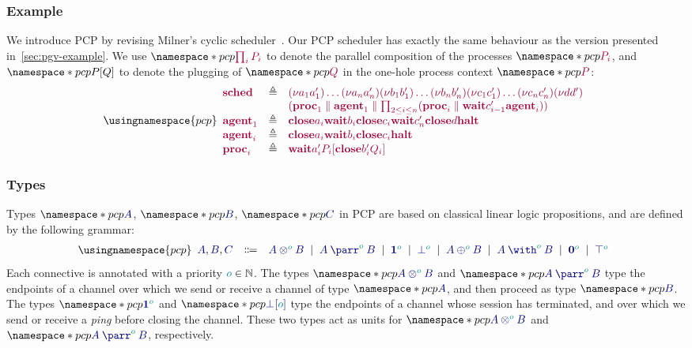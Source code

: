 \documentclass[main.tex]{subfiles}
\begin{document}
\subsubsection*{Example}\label{sec:pcp-example}
We introduce PCP by revising Milner's cyclic scheduler~\cite{milner89,dardhagay18}. Our PCP scheduler has exactly the same behaviour as the version presented in~\cref{sec:pgv-example}. We use $\pcp{\tm{\prod_{i}P_i}}$ to denote the parallel composition of the processes $\pcp{\tm{P_i}}$, and $\pcp{\plug{P}{Q}}$ to denote the plugging of $\pcp{\tm{Q}}$ in the one-hole process context $\pcp{\tm{P}}$:
\[
  \usingnamespace{pcp}
  \begin{array}{lrlr}
    \tm{\sched}
    & \defeq & \tm{\res{a_1}{a'_1}{\dots{\res{a_n}{a'_n}{}}}}
               \tm{\res{b_1}{b'_1}{\dots{\res{b_n}{b'_n}{}}}}
               \tm{\res{c_1}{c'_1}{\dots{\res{c_n}{c'_n}{}}}}
               \tm{\res{d}{d'}{}}
    \\ &     & \tm{(
               \ppar{\proc1}{\agent1}
               \parallel
               \prod_{2\leq{i}\leq{n}}(\ppar{\proc{i}}{\wait{c'_{i-1}}{\agent{i}}})
               )}
    \\
    \tm{\agent1}
    & \defeq & \tm{\close{a_i}{\wait{b_i}{\close{c_i}{\wait{c'_n}{\close{d}{\halt}}}}}}
    \\
    \tm{\agent{i}}
    & \defeq & \tm{\close{a_i}{\wait{b_i}{\close{c_i}{\halt}}}}
    \\
    \tm{\proc{i}}
    & \defeq & \tm{\wait{a'_i}{\plug{P_i}{\close{b'_i}{Q_i}}}}
  \end{array}
\]

\subsubsection*{Types}
Types $\pcp{\ty{A}}$, $\pcp{\ty{B}}$, $\pcp{\ty{C}}$ in PCP are based on classical linear logic propositions, and are defined by the following grammar:
\[
  \usingnamespace{pcp}
  \begin{array}{lcl}
    \ty{A}, \ty{B}, \ty{C}
    & \Coloneqq & \ty{\tytens[\cs{o}]{A}{B}}
      \sep        \ty{\typarr[\cs{o}]{A}{B}}
      \sep        \ty{\tyone[\cs{o}]}
      \sep        \ty{\tybot[\cs{o}]}
      \sep        \ty{\typlus[\cs{o}]{A}{B}}
      \sep        \ty{\tywith[\cs{o}]{A}{B}}
      \sep        \ty{\tynil[\cs{o}]}
      \sep        \ty{\tytop[\cs{o}]}
  \end{array}
\]
Each connective is annotated with a priority $\cs{o}\in\mathbb{N}$.
The types $\pcp{\ty{\tytens[\cs{o}]{A}{B}}}$ and $\pcp{\ty{\typarr[\cs{o}]{A}{B}}}$ type the endpoints of a channel over which we send or receive a channel of type $\pcp{\ty{A}}$, and then proceed as type $\pcp{\ty{B}}$. The types $\pcp{\ty{\tyone[\cs{o}]}}$ and $\pcp{\ty{{\tybot}[\cs{o}]}}$ type the endpoints of a channel whose session has terminated, and over which we send or receive a \emph{ping} before closing the channel. These two types act as units for $\pcp{\ty{\tytens[\cs{o}]{A}{B}}}$ and $\pcp{\ty{\typarr[\cs{o}]{A}{B}}}$, respectively.
\end{document}
